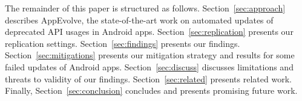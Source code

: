 
The remainder of this paper is structured as follows. Section~\ref{sec:approach} describes AppEvolve, the state-of-the-art work on automated updates of deprecated API usages in Android apps. Section~\ref{sec:replication} presents our replication settings. Section~\ref{sec:findings} presents our findings. Section~\ref{sec:mitigations} presents our mitigation strategy and results for some failed updates of Android apps.
Section~\ref{sec:discuss} discusses limitations and threats to validity of our findings.
Section~\ref{sec:related} presents related work.
Finally, Section~\ref{sec:conclusion} concludes and presents promising future work.
